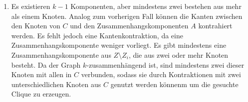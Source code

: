 \begin{beweis}
\begin{enumerate}
\item Es existieren $k-1$ Komponenten, aber mindestens zwei bestehen aus mehr als einem Knoten.
      Analog zum vorherigen Fall können die Kanten zwischen den Knoten von $C$ und den Zusammenhangskomponenten $A$ kontrahiert werden.
      Es fehlt jedoch eine Kantenkontraktion, da eine Zusammenhangskomponente weniger vorliegt.
      Es gibt mindestens eine Zusammenhangskomponente aus $Z \setminus Z_i$, die aus zwei oder mehr Knoten besteht.
      Da der Graph $k$-zusammenhängend ist, sind mindestens zwei dieser Knoten mit allen in $C$ verbunden, sodass sie durch Kontraktionen mit zwei unterschiedlichen Knoten aus $C$ genutzt werden könnenm um die gesuchte Clique zu erzeugen.
\end{enumerate}
\end{beweis}
